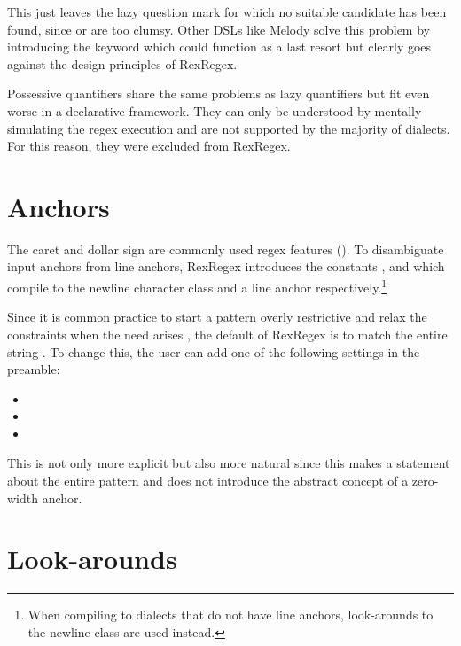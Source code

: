 This just leaves the lazy question mark  for which no suitable candidate has been found, since  or  are too clumsy. Other DSLs like Melody \cite{RegexDslMelody} solve this problem by introducing the  keyword which could function as a last resort but clearly goes against the design principles of RexRegex.

Possessive quantifiers share the same problems as lazy quantifiers but fit even worse in a declarative framework. They can only be understood by mentally simulating the regex execution and are not supported by the majority of dialects. For this reason, they were excluded from RexRegex.

\section{Anchors} \label{sec:dslAnchors}

The caret \pattern{\caret} and dollar sign \pattern{\$} are commonly used regex features (). To disambiguate input anchors from line anchors, RexRegex introduces the constants ,  and  
which compile to the newline character class and a line anchor respectively.\footnote{When compiling to dialects that do not have line anchors, look-arounds to the newline class are used instead.} 

Since it is common practice to start a pattern overly restrictive and relax the constraints when the need arises \cite{RegexesAreHard}, the default of RexRegex is to match the entire string \pattern{\caret\placeholder\dollar}. To change this, the user can add one of the following  settings in the preamble:

\begin{itemize}
    \setlength\itemsep{0em}
    \vspace{-.7em}
    \item {}
    \item {}
    \item {}
    \vspace{-.7em}
\end{itemize}

 This is not only more explicit but also more natural since this makes a statement about the entire pattern and does not introduce the abstract concept of a zero-width anchor.

\section{Look-arounds}


